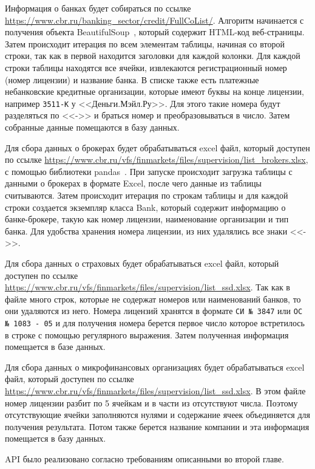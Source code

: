 \documentclass{article}
\begin{document}
Информация о банках будет собираться по ссылке \url{https://www.cbr.ru/banking\_sector/credit/FullCoList/}. Алгоритм начинается с получения объекта BeautifulSoup~\autocite{richardsonleonard_beautiful_2007}, который содержит HTML-код веб-страницы. Затем происходит итерация по всем элементам таблицы, начиная со второй строки, так как в первой находится заголовки для каждой колонки. Для каждой строки таблицы находятся все ячейки, извлекаются регистрационный номер (номер лицензии) и название банка. В списке также есть платежные небанковские кредитные организации, которые имеют буквы на конце лицензии, например \texttt{3511-К} у {}<<Деньги.Мэйл.Ру>>{}. Для этого такие номера будут разделяться по {}<<->>{} и браться номер и преобразовываться в число. Затем собранные данные помещаются в базу данных.

Для сбора данных о брокерах будет обрабатываться excel файл, который доступен по ссылке \url{https://www.cbr.ru/vfs/finmarkets/files/supervision/list\_brokers.xlsx}, с помощью библиотеки pandas~\autocite{team_pandasdev_2023}. При запуске происходит загрузка таблицы с данными о брокерах в формате Excel, после чего данные из таблицы считываются. Затем происходит итерация по строкам таблицы и для каждой строки создается экземпляр класса Bank, который содержит информацию о банке-брокере, такую как номер лицензии, наименование организации и тип банка. Для удобства хранения номера лицензии, из них удалялись все знаки {}<<->>{}.

Для сбора данных о страховых будет обрабатываться excel файл, который доступен по ссылке \url{https://www.cbr.ru/vfs/finmarkets/files/supervision/list\_ssd.xlsx}. Так как в файле много строк, которые не содержат номеров или наименований банков, то они удаляются из него. Номера лицензий хранятся в формате \texttt{СИ № 3847} или \texttt{ОС № 1083 - 05} и для получения номера берется первое число которое встретилось в строке с помощью регулярного выражения. Затем полученная информация помещается в базе данных.

Для сбора данных о микрофинансовых организациях будет обрабатываться excel файл, который доступен по ссылке \url{https://www.cbr.ru/vfs/finmarkets/files/supervision/list\_ssd.xlsx}. В этом файле номер лицензии разбит по 5 ячейкам и в части из отсутствуют числа. Поэтому отсутствующие ячейки заполняются нулями и содержание ячеек объединяется для получения результата. Потом также берется название компании и эта информация помещается в базу данных.

API было реализовано согласно требованиям описанными во второй главе.
\end{document}

